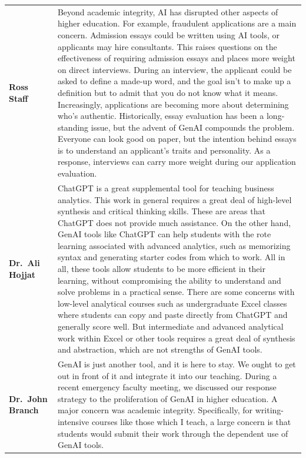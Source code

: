 \documentclass[
]{book}
\begin{document}
\begin{longtable}[]{@{}
  >{\raggedright\arraybackslash}p{}
  >{\raggedright\arraybackslash}p{}@{}}
\toprule\noalign{}
\endhead
\bottomrule\noalign{}
\endlastfoot
\textbf{Ross Staff} & Beyond academic integrity, AI has disrupted other aspects of higher education. For example, fraudulent applications are a main concern. Admission essays could be written using AI tools, or applicants may hire consultants. This raises questions on the effectiveness of requiring admission essays and places more weight on direct interviews. During an interview, the applicant could be asked to define a made-up word, and the goal isn't to make up a definition but to admit that you do not know what it means. Increasingly, applications are becoming more about determining who's authentic. Historically, essay evaluation has been a long-standing issue, but the advent of GenAI compounds the problem. Everyone can look good on paper, but the intention behind essays is to understand an applicant's traits and personality. As a response, interviews can carry more weight during our application evaluation. \\
\textbf{Dr.~Ali Hojjat} & ChatGPT is a great supplemental tool for teaching business analytics. This work in general requires a great deal of high-level synthesis and critical thinking skills. These are areas that ChatGPT does not provide much assistance. On the other hand, GenAI tools like ChatGPT can help students with the rote learning associated with advanced analytics, such as memorizing syntax and generating starter codes from which to work. All in all, these tools allow students to be more efficient in their learning, without compromising the ability to understand and solve problems in a practical sense. There are some concerns with low-level analytical courses such as undergraduate Excel classes where students can copy and paste directly from ChatGPT and generally score well. But intermediate and advanced analytical work within Excel or other tools requires a great deal of synthesis and abstraction, which are not strengths of GenAI tools. \\
\textbf{Dr.~John Branch} & GenAI is just another tool, and it is here to stay. We ought to get out in front of it and integrate it into our teaching. During a recent emergency faculty meeting, we discussed our response strategy to the proliferation of GenAI in higher education. A major concern was academic integrity. Specifically, for writing-intensive courses like those which I teach, a large concern is that students would submit their work through the dependent use of GenAI tools. \\

\end{longtable}
\end{document}
